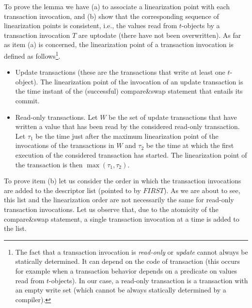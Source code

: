 \begin{proofL}
To prove the lemma we have (a) to associate a linearization point  with 
each  transaction  invocation, and (b) show that the corresponding sequence
of linearization points is consistent, i.e., the values read from  
$t$-objects by a transaction  invocation $T$ are uptodate  
(there have not been overwritten). 
As far as  item (a) is concerned, the  linearization  point of 
a transaction invocation is defined as follows\footnote{The 
fact  that a  transaction invocation is {\it read-only} or {\it  update} 
cannot always be statically determined. It can depend on the 
code of transaction (this occurs for example when a transaction  
behavior depends on  a predicate on values read from $t$-objects).
In our case, a read-only transaction   is a transaction with an empty write
set (which cannot be always statically determined   by a compiler).}.
\begin{itemize}
\item Update transactions 
(these are the transactions that write at least one $t$-object). 
The linearization point of the invocation of an update transaction is the time 
instant of the (successful) compare\&swap statement that entails its commit.  
\item Read-only transactions. 
Let $W$  be the set of update  transactions that have written  a value that
has been read 
by the considered read-only transaction. Let $\tau_1$ be the time just after
the maximum linearization point of the invocations of the transactions in $W$ 
and $\tau_2$ be the time at which the first execution 
of the considered transaction has started.
The linearization point of the transaction is then $\max(\tau_1,\tau_2)$.
%
\end{itemize}

To prove item (b) let us consider the order in which  the transaction 
invocations are added to the descriptor list (pointed to by $\mathit{FIRST}$). 
As we are about to see, this  list and the linearization order are not
necessarily the same for read-only transaction invocations.  
Let us observe that, due  to the atomicity of the compare\&swap statement, 
a single transaction  invocation at a time is added to the list.


\end{proofL}
